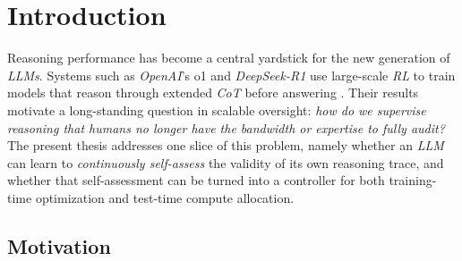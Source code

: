 \documentclass[a4paper,oneside,10pt,english]{scrbook}
\DeclareRobustCommand{\acfit}[1]{\textit{\ac{#1}}}
\DeclareRobustCommand{\acfpit}[1]{\textit{\acp{#1}}}
\begin{document}

\mainmatter

\acresetall


\cleardoubleoddpage
\chapter{Introduction}
\label{ch:introduction}

Reasoning performance has become a central yardstick for the new generation of \acfpit{LLM}. Systems such as \textit{OpenAI}'s o1 and \textit{DeepSeek-R1} use large-scale \acfit{RL} to train models that reason through extended \acfit{CoT} before answering \citep{o1,r1}. Their results motivate a long-standing question in scalable oversight: \emph{how do we supervise reasoning that humans no longer have the bandwidth or expertise to fully audit?} The present thesis addresses one slice of this problem, namely whether an \acfit{LLM} can learn to \emph{continuously self-assess} the validity of its own reasoning trace, and whether that self-assessment can be turned into a controller for both training-time optimization and test-time compute allocation.

\section{Motivation}
\label{sec:intro:motivation}
\end{document}
